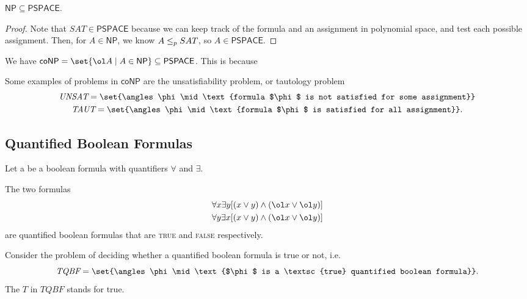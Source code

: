 \documentclass{standalone}
\begin{document}
\begin{theorem}
	\(\mathsf{NP} \subseteq \mathsf{PSPACE}\).
\end{theorem}
\begin{proof}
	Note that \(\textit{SAT} \in \mathsf{PSPACE}\) because we can keep track of the formula and an assignment in polynomial space, and test each possible assignment. Then, for \(A \in \mathsf{NP}\), we know \(A \mathrel{\leq_p} SAT\), so \(A \in \mathsf{PSPACE}\).
\end{proof}

\begin{example}
	We have \(\mathsf{coNP} = \set{\ol A \mid A \in \mathsf{NP}} \subseteq \mathsf{PSPACE}\). This is because 

	Some examples of problems in \(\mathsf{coNP}\) are the unsatisfiability problem, or tautology problem
	\begin{gather*}
		\textit{UNSAT} = \set{\angles \phi \mid \text{formula $\phi$ is not satisfied for some assignment}} \\
		\textit{TAUT} = \set{\angles \phi \mid \text{formula $\phi$ is satisfied for all assignment}}.
	\end{gather*}
\end{example}

\subsection{Quantified Boolean Formulas}
Let a  be a boolean formula with quantifiers \(\forall\) and \(\exists\).
\begin{example}
	The two formulas
	\begin{gather*}
		\forall x \exists y [(x \lor y) \land (\ol x \lor \ol y)] \\
		\forall y \exists x [(x \lor y) \land (\ol x \lor \ol y)]
	\end{gather*}
	are quantified boolean formulas that are \textsc{true} and \textsc{false} respectively.
\end{example}

Consider the problem of deciding whether a quantified boolean formula is true or not, i.e.
\[
	\textit{TQBF} = \set{\angles\phi \mid \text{$\phi$ is a \textsc{true} quantified boolean formula}}.
\]
The \(\textit{T}\) in \(\textit{TQBF}\) stands for true.
\end{document}
